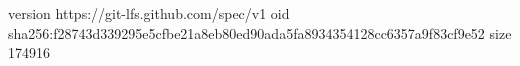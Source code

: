 version https://git-lfs.github.com/spec/v1
oid sha256:f28743d339295e5cfbe21a8eb80ed90ada5fa8934354128cc6357a9f83cf9e52
size 174916
